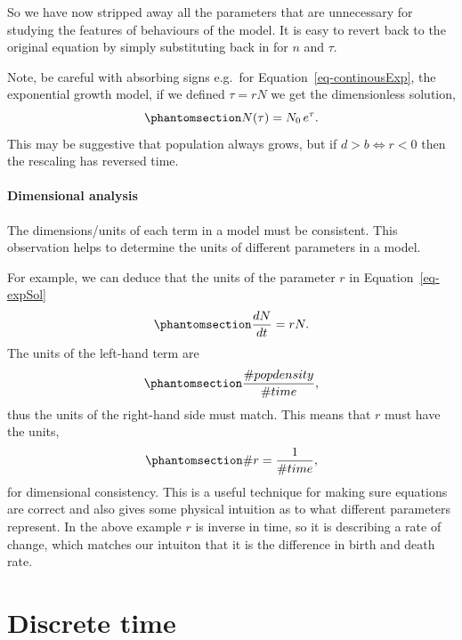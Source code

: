 \documentclass[
  letterpaper,
  DIV=11,
  numbers=noendperiod]{scrreprt}
\begin{document}
So we have now stripped away all the parameters that are unnecessary for
studying the features of behaviours of the model. It is easy to revert
back to the original equation by simply substituting back in for \(n\)
and \(\tau\).

Note, be careful with absorbing signs e.g.~for
Equation~\ref{eq-continousExp}, the exponential growth model, if we
defined \(\tau = r N\) we get the dimensionless solution,
\begin{equation}\protect\phantomsection\label{eq-nonDimExp}{
N(\tau) = N_0 \, e^{\tau}.
}\end{equation} This may be suggestive that population always grows, but
if \(d > b \Leftrightarrow r < 0\) then the rescaling has reversed time.

\subsection{Dimensional analysis}\label{dimensional-analysis}

The dimensions/units of each term in a model must be consistent. This
observation helps to determine the units of different parameters in a
model.

For example, we can deduce that the units of the parameter \(r\) in
Equation~\ref{eq-expSol}
\begin{equation}\protect\phantomsection\label{eq-dim1}{
\frac{dN}{dt}=rN.
}\end{equation} The units of the left-hand term are
\begin{equation}\protect\phantomsection\label{eq-dim2}{
\frac{\# pop density}{\# time},
}\end{equation} thus the units of the right-hand side must match. This
means that \(r\) must have the units,
\begin{equation}\protect\phantomsection\label{eq-dim3}{
\#r = \frac{1}{\#time},
}\end{equation} for dimensional consistency. This is a useful technique
for making sure equations are correct and also gives some physical
intuition as to what different parameters represent. In the above
example \(r\) is inverse in time, so it is describing a rate of change,
which matches our intuiton that it is the difference in birth and death
rate.

\part{Discrete time}
\end{document}
